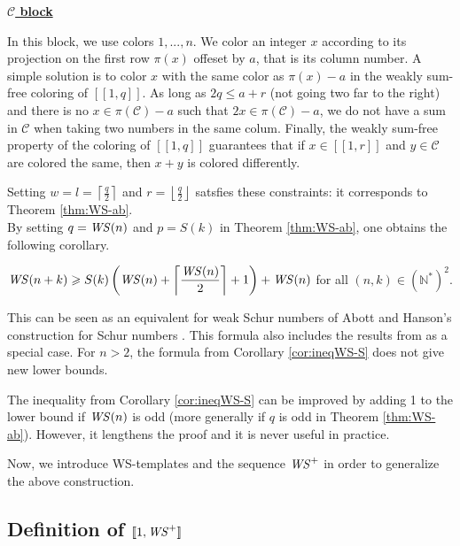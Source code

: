 \noindent \underline{\textbf{\(\mathcal{C}\) block}}
\par
In this block, we use colors \(1, ..., n\). We color an integer \(x\) according to its projection on the first row \(\pi(x)\) offeset by \(a\), 
that is its column number. A simple solution is to color \(x\) with the same color as \(\pi(x) - a\) in the weakly sum-free coloring of 
\([\![1,q]\!]\). As long as \(2q \leqslant a + r\) (not going two far to the right) and there is no \(x \in \pi(\mathcal{C}) - a\) such that 
\(2x \in \pi(\mathcal{C}) - a\), we do not have a sum in \(\mathcal{C}\) when taking two numbers in the same colum. Finally, the 
weakly sum-free property of the coloring of \([\![1,q]\!]\) guarantees that if \(x \in [\![1,r]\!]\) and \(y \in \mathcal{C}\) are colored 
the same, then \(x + y\) is colored differently.

Setting \(w = l = \left\lceil \displaystyle \frac{q}{2} \right\rceil\) and \(r = \left\lfloor \displaystyle \frac{q}{2} \right\rfloor\) satsfies these 
constraints: it corresponds to Theorem \ref{thm:WS-ab}. \\

By setting \(q = \mathit{WS} (n)\) and \(p = S(k)\) in Theorem \ref{thm:WS-ab}, one obtains the following corollary.

\begin{corollary}
\label{cor:ineqWS-S}
\(\mathit{WS} (n+k) \geqslant S(k) \left (\mathit{WS} (n) + \left \lceil \displaystyle \frac{\mathit{WS} (n)}{2} \right \rceil +1 \right) + \mathit{WS} (n)\)
for all \((n,k) \in (\mathbb{N}^*)^2\).
\end{corollary}

This can be seen as an equivalent for weak Schur numbers of Abott and Hanson's construction for Schur numbers 
\cite{AbbottHanson}. This formula also includes the results from \cite{RowleyWS} as a special case. For \(n>2\), 
the formula from Corollary \ref{cor:ineqWS-S} does not give new lower bounds.

\begin{remark}
The inequality from Corollary \ref{cor:ineqWS-S} can be improved by adding 1 to the lower bound if \(\mathit{WS} (n)\) is odd (more generally if \(q\) is
odd in Theorem \ref{thm:WS-ab}). However, it lengthens the proof and it is never useful in practice.
\end{remark}
\par
Now, we introduce WS-templates and the sequence \(\mathit{WS}^+\) in order to generalize the above construction.

\subsection{Definition of \([\![ 1, \mathit{WS}^+ ]\!]\)}
\label{DefinitionWS+}

